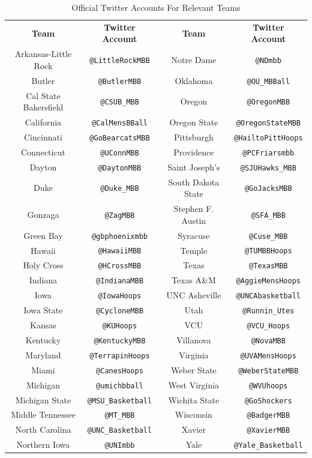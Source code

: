 \documentclass[12pt]{article}
\begin{document}
\begin{doublespacing}
\begin{table}[H] 
\centering 
\caption{Official Twitter Accounts For Relevant Teams}  
\begin{tabular} {c c c c}
\hline \hline 
\textbf{Team} & \textbf{Twitter Account} & \textbf{Team} & \textbf{Twitter Account} \\ [0.5ex]  
Arkansas-Little Rock & \texttt{@LittleRockMBB} & Notre Dame & \texttt{@NDmbb} \\
Butler & \texttt{@ButlerMBB} & Oklahoma & \texttt{@OU\_MBBall} \\
Cal State Bakersfield & \texttt{@CSUB\_MBB} & Oregon & \texttt{@OregonMBB} \\
California & \texttt{@CalMensBBall} & Oregon State & \texttt{@OregonStateMBB} \\
Cincinnati & \texttt{@GoBearcatsMBB} & Pittsburgh & \texttt{@HailtoPittHoops}  \\
Connecticut & \texttt{@UConnMBB}  & Providence & \texttt{@PCFriarsmbb} \\
Dayton & \texttt{@DaytonMBB}  & Saint Joseph's & \texttt{@SJUHawks\_MBB} \\
Duke & \texttt{@Duke\_MBB}  & South Dakota State & \texttt{@GoJacksMBB}\\ 
Gonzaga & \texttt{@ZagMBB} & Stephen F. Austin & \texttt{@SFA\_MBB} \\
Green Bay & \texttt{@gbphoenixmbb} & Syracuse & \texttt{@Cuse\_MBB} \\
Hawaii & \texttt{@HawaiiMBB} & Temple & \texttt{@TUMBBHoops} \\
Holy Cross & \texttt{@HCrossMBB} & Texas & \texttt{@TexasMBB} \\
Indiana & \texttt{@IndianaMBB} & Texas A\&M & \texttt{@AggieMensHoops} \\
Iowa & \texttt{@IowaHoops} & UNC Asheville & \texttt{@UNCAbasketball} \\
Iowa State & \texttt{@CycloneMBB} & Utah & \texttt{@Runnin\_Utes} \\
Kansas & \texttt{@KUHoops} & VCU & \texttt{@VCU\_Hoops} \\
Kentucky & \texttt{@KentuckyMBB} & Villanova & \texttt{@NovaMBB} \\
Maryland & \texttt{@TerrapinHoops} & Virginia & \texttt{@UVAMensHoops} \\
Miami & \texttt{@CanesHoops} & Weber State & \texttt{@WeberStateMBB}\\
Michigan & \texttt{@umichbball} & West Virginia & \texttt{@WVUhoops} \\
Michigan State & \texttt{@MSU\_Basketball} & Wichita State & \texttt{@GoShockers} \\
Middle Tennessee & \texttt{@MT\_MBB} & Wisconsin & \texttt{@BadgerMBB}  \\
North Carolina & \texttt{@UNC\_Basketball} & Xavier & \texttt{@XavierMBB} \\
Northern Iowa & \texttt{@UNImbb} & Yale & \texttt{@Yale\_Basketball} \\
\hline 

\end{tabular}
\end{table}

\end{doublespacing}
\end{document}
